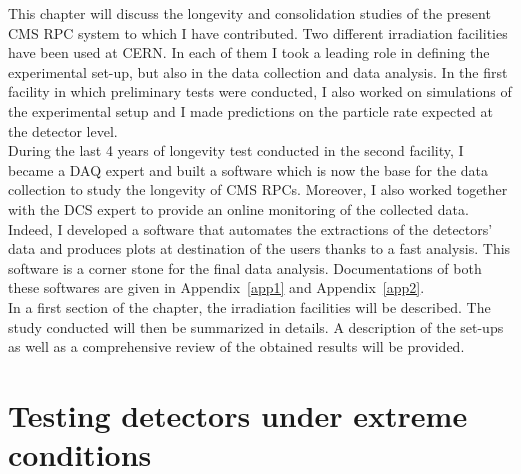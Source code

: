 	This chapter will discuss the longevity and consolidation studies of the present CMS RPC system to which I have contributed. Two different irradiation facilities have been used at CERN. In each of them I took a leading role in defining the experimental set-up, but also in the data collection and data analysis. In the first facility in which preliminary tests were conducted, I also worked on simulations of the experimental setup and I made predictions on the particle rate expected at the detector level.\\
	During the last 4 years of longevity test conducted in the second facility, I became a DAQ expert and built a software which is now the base for the data collection to study the longevity of CMS RPCs. Moreover, I also worked together with the \acf{DCS} expert to provide an online monitoring of the collected data. Indeed, I developed a software that automates the extractions of the detectors' data and produces plots at destination of the users thanks to a fast analysis. This software is a corner stone for the final data analysis. Documentations of both these softwares are given in Appendix~\ref{app1} and Appendix~\ref{app2}.\\
	In a first section of the chapter, the irradiation facilities will be described. The study conducted will then be summarized in details. A description of the set-ups as well as a comprehensive review of the obtained results will be provided.

\section{Testing detectors under extreme conditions}
\label{chapt5:sec:extreme}
    
